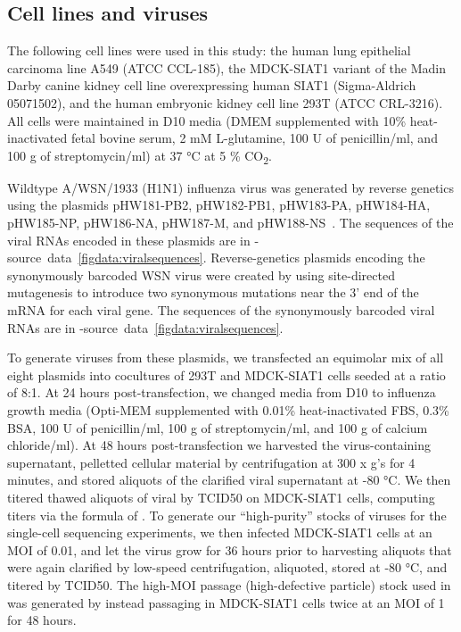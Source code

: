 \documentclass[9pt,lineno]{elife}
\begin{document}
\subsection{Cell lines and viruses}
The following cell lines were used in this study: the human lung epithelial carcinoma line A549 (ATCC CCL-185), the MDCK-SIAT1 variant of the Madin Darby canine kidney cell line overexpressing human SIAT1 (Sigma-Aldrich 05071502), and the human embryonic kidney cell line 293T (ATCC CRL-3216). 
All cells were maintained in D10 media (DMEM supplemented with 10\% heat-inactivated fetal bovine serum, 2 mM L-glutamine, 100 U of penicillin/ml, and 100 \si{\micro}g of streptomycin/ml) at 37 \si{\degreeCelsius} at 5 \% CO\textsubscript{2}.

Wildtype A/WSN/1933 (H1N1) influenza virus was generated by reverse genetics using the plasmids pHW181-PB2, pHW182-PB1, pHW183-PA, pHW184-HA, pHW185-NP, pHW186-NA, pHW187-M, and pHW188-NS~\citep{hoffmann2000dna}.
The sequences of the viral RNAs encoded in these plasmids are in -source~data~\ref{figdata:viralsequences}.
Reverse-genetics plasmids encoding the synonymously barcoded WSN virus were created by using site-directed mutagenesis to introduce two synonymous mutations near the 3' end of the mRNA for each viral gene.
The sequences of the synonymously barcoded viral RNAs are in -source~data~\ref{figdata:viralsequences}.

To generate viruses from these plasmids, we transfected an equimolar mix of all eight plasmids into cocultures of 293T and MDCK-SIAT1 cells seeded at a ratio of 8:1. 
At 24 hours post-transfection, we changed media from D10 to influenza growth media (Opti-MEM supplemented with 0.01\% heat-inactivated FBS, 0.3\% BSA, 100 U of penicillin/ml, 100  \si{\micro}g of streptomycin/ml, and 100 \si{\micro}g of calcium chloride/ml).
At 48 hours post-transfection we harvested the virus-containing supernatant, pelletted cellular material by centrifugation at 300 x g's for 4 minutes, and stored aliquots of the clarified viral supernatant at -80 \si{\degreeCelsius }. 
We then titered thawed aliquots of viral by TCID50 on MDCK-SIAT1 cells, computing titers via the formula of \citet{reed1938simple}.
To generate our ``high-purity'' stocks of viruses for the single-cell sequencing experiments, we then infected MDCK-SIAT1 cells at an MOI of 0.01, and let the virus grow for 36 hours prior to harvesting aliquots that were again clarified by low-speed centrifugation, aliquoted, stored at -80  \si{\degreeCelsius }, and titered by TCID50.
The high-MOI passage (high-defective particle) stock used in  was generated by instead passaging in MDCK-SIAT1 cells twice at an MOI of 1 for 48 hours.
\end{document}
